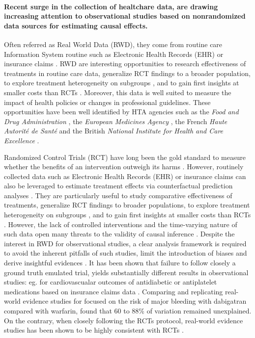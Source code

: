 
\paragraph{Recent surge in the collection of healtchare data, are drawing
    increasing attention to observational studies based on nonrandomized data
    sources for estimating causal effects.} Often referred as Real World Data
(RWD), they come from routine care Information System routine such as
Electronic Health Records (EHR) or insurance claims
\citep{wang2023emulation}. RWD are interesting opportunities to research
effectiveness of treatments in routine care data, generalize RCT findings to
a broader population, to explore treatment heterogeneity on subgroups
\citep{mant1999can, desai2021broadening}, and to gain first insights at
smaller costs than RCTs \citep{black1996we,bosdriesz2020evidence}. Moreover,
this data is well suited to measure the impact of health policies or changes
in professional guidelines. These opportunities have been well identified by
HTA agencies such as the \textit{Food and Drug Administration}
\citep{desai2021broadening,fda_real-world_2021}, the \textit{European
    Medicines Agency} \citep{flynn_marketing_2022}, the French \textit{Haute
    Autorité de Santé} \citep{vanier2023rapid} and the British \textit{National
    Institute for Health and Care Excellence} \citep{kent_nice_2022}.

%
Randomized Control Trials (RCT) have
long been the gold standard to measure whether the benefits of an intervention
outweigh its harms \citep{brook1986method}. However, routinely collected data
such as Electronic Health Records (EHR) or insurance claims
\citep{wang2023early} can also be leveraged to estimate treatment effects via
counterfactual prediction analyses \citep{hernan2019second}.  They are
particularly useful to study comparative effectiveness of treatments,
generalize RCT findings to broader populations, to explore treatment
heterogeneity on subgroups \citep{mant1999can,desai2021broadening}, and to
gain first insights at smaller costs than RCTs
\citep{black1996we,bosdriesz2020evidence}. However, the lack of controlled
interventions and the time-varying nature of such data open many threats to
the validity of causal inference \citep{bouvier2023should}.
Despite the interest in RWD for observational studies, a clear analysis
framework is required to avoid the inherent pitfalls of such studies, limit the
introduction of biases and derive insightful evidences \citep{hernan2019second,
    wang2023emulation}. It has been shown that failure to follow closely a ground
truth emulated trial,
yields substantially different results in observational studies: eg. for
cardiovascualar outcomes of antidiabetic or antiplatelet medications based on
insurance claims data \citep{schneeweiss2021conducting}. Comparing and
replicating real-world evidence studies for focused on the risk of major
bleeding
with dabigatran compared with warfarin, \cite{wang2022understanding} found that
60 to 88\% of variation remained unexplained. On the contrary, when closely
following the RCTs protocol, real-world evidence studies has been shown to be
highly consistent with RCTs \citep{wang2023emulation}.


